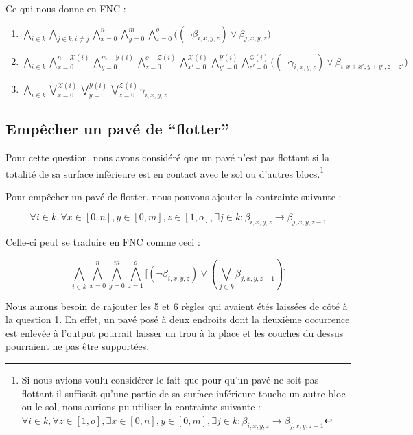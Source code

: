 \documentclass[a4paper]{article}
\begin{document}
Ce qui nous donne en FNC :

\begin{enumerate}
  \item $
  \bigwedge_{i \in k} \bigwedge_{j \in k, i \neq j}
  \bigwedge_{x=0}^{n} \bigwedge_{y=0}^{m} \bigwedge_{z=0}^{o}
  \Big( (\lnot \beta_{i, x, y, z}) \lor \beta_{j, x, y, z} \Big)
  $

  \item $
  \bigwedge_{i \in k}
  \bigwedge_{x=0}^{n - \mathcal{X}(i)} \bigwedge_{y=0}^{m - \mathcal{Y}(i)} \bigwedge_{z=0}^{o - \mathcal{Z}(i)}
  \bigwedge_{x'=0}^{\mathcal{X}(i)} \bigwedge_{y'=0}^{\mathcal{Y}(i)} \bigwedge_{z'=0}^{\mathcal{Z}(i)}
  \Big( (\lnot \gamma_{i, x, y, z}) \lor \beta_{i, x+x', y+y', z+z'} \Big)
  $

  \item $
  \bigwedge_{i \in k}
  \bigvee_{x=0}^{\mathcal{X}(i)} \bigvee_{y=0}^{\mathcal{Y}(i)} \bigvee_{z=0}^{\mathcal{Z}(i)}
  \gamma_{i, x, y, z}
  $
\end{enumerate}

\subsection{Empêcher un pavé de ``flotter''}

Pour cette question, nous avons considéré que un pavé n'est pas flottant si la totalité de sa surface inférieure est en contact avec le sol ou d'autres blocs.\footnote{Si nous avions voulu considérer le fait que pour qu'un pavé ne soit pas flottant il suffisait qu'une partie de sa surface inférieure touche un autre bloc ou le sol, nous aurions pu utiliser la contrainte suivante : $
\forall i \in k, \forall z \in [1, o], \exists x \in [0, n], y \in [0, m],
\exists j \in k : \beta_{i, x, y, z} \rightarrow \beta_{j, x, y, z-1}
$}

Pour empêcher un pavé de flotter, nous pouvons ajouter la contrainte suivante :

$$
\forall i \in k, \forall x \in [0, n], y \in [0, m], z \in [1, o],
\exists j \in k : \beta_{i, x, y, z} \rightarrow \beta_{j, x, y, z-1}
$$

Celle-ci peut se traduire en FNC comme ceci :

$$
\bigwedge_{i \in k}
  \bigwedge_{x=0}^{n} \bigwedge_{y=0}^{m} \bigwedge_{z=1}^{o}
  \Big[
  (\lnot \beta_{i, x, y, z}) \lor (\bigvee_{j \in k} \beta_{j, x, y, z-1})
  \Big]
$$

Nous aurons besoin de rajouter les 5 et 6 règles qui avaient étés laissées de côté à la question 1. En effet, un pavé posé à deux endroits dont la deuxième occurrence est enlevée à l'output pourrait laisser un trou à la place et les couches du dessus pourraient ne pas être supportées.
\end{document}
